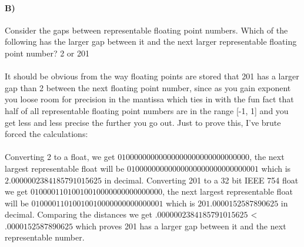 \documentclass{article}
\begin{document}
\paragraph{B)}
Consider the gaps between representable floating point numbers. Which of the following has the larger gap between it and the next larger representable floating point number? 2 or 201
\paragraph{}
It should be obvious from the way floating points are stored that 201 has a larger gap than 2 between the next floating point number, since as you gain exponent you loose room for precision in the mantissa which ties in with the fun fact that half of all representable floating point numbers are in the range [-1, 1] and you get less and less precise the further you go out. Just to prove this, I've brute forced the calculations: 
\paragraph{}
Converting 2 to a float, we get $01000000000000000000000000000000$, the next largest representable float will be $01000000000000000000000000000001$ which is $2.0000002384185791015625$ in decimal. Converting 201 to a 32 bit IEEE 754 float we get $01000011010010010000000000000000$, the next largest representable float will be $01000011010010010000000000000001$ which is $201.0000152587890625$ in decimal. Comparing the distances we get $.0000002384185791015625$ $<\\$ $.0000152587890625$ which proves 201 has a larger gap between it and the next representable number. 
\end{document}
